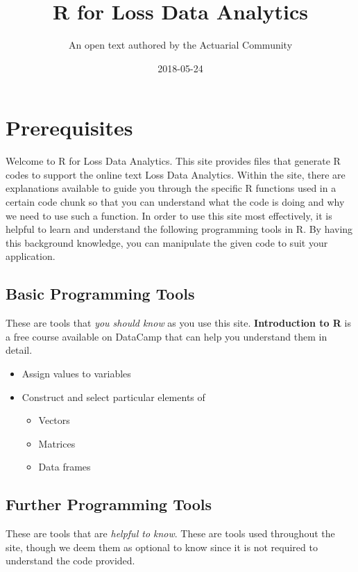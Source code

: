 \documentclass[]{book}
\title{R for Loss Data Analytics}
\author{An open text authored by the Actuarial Community}
\date{2018-05-24}
\providecommand{\tightlist}{%
  \setlength{\itemsep}{0pt}\setlength{\parskip}{0pt}}
\theoremstyle{definition}
\theoremstyle{definition}
\theoremstyle{definition}
\theoremstyle{remark}
\begin{document}
\maketitle

{
\setcounter{tocdepth}{1}
\tableofcontents
}
\chapter{Prerequisites}\label{prerequisites}

Welcome to R for Loss Data Analytics. This site provides files that
generate R codes to support the online text Loss Data Analytics. Within
the site, there are explanations available to guide you through the
specific R functions used in a certain code chunk so that you can
understand what the code is doing and why we need to use such a
function. In order to use this site most effectively, it is helpful to
learn and understand the following programming tools in R. By having
this background knowledge, you can manipulate the given code to suit
your application.

\section{Basic Programming Tools}\label{basic-programming-tools}

These are tools that \emph{you should know} as you use this site.
\textbf{Introduction to R} is a free course available on DataCamp that
can help you understand them in detail.

\begin{itemize}
\tightlist
\item
  Assign values to variables
\item
  Construct and select particular elements of

  \begin{itemize}
  \tightlist
  \item
    Vectors
  \item
    Matrices
  \item
    Data frames
  \end{itemize}
\end{itemize}

\section{Further Programming Tools}\label{further-programming-tools}

These are tools that are \emph{helpful to know}. These are tools used
throughout the site, though we deem them as optional to know since it is
not required to understand the code provided.
\end{document}
